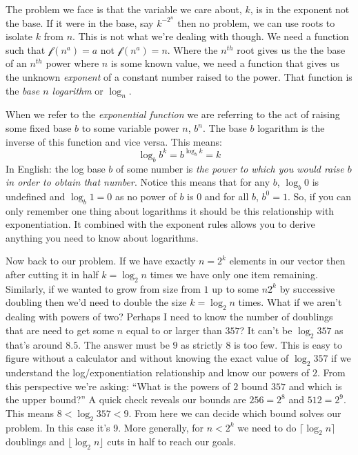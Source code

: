 \documentclass[nobib]{tufte-handout}
\begin{document}
The problem we face is that the variable we care about, $k$, is in the exponent not the base. If it were in the base, say $k^{-2^n}$ then no problem, we can use roots to isolate $k$ from $n$. This is not what we're dealing with though. We need a function such that $\mathcal{f}(n^a)=a$ not $\mathcal{f}(n^a) = n$. Where the $n^{th}$ root gives us the the base of an $n^{th}$ power where $n$ is some known value, we need a function that gives us the unknown \textit{exponent} of a constant number raised to the power. That function is the \textit{base $n$ logarithm} or $\log_n$.

When we refer to the \textit{exponential function} we are referring to the act of raising some fixed base $b$ to some variable power $n$, $b^n$. The base $b$ logarithm is the inverse of this function and vice versa. This means:
\begin{equation}
  \log_b{b^k} = b^{\log_b{k}} = k
\end{equation}
In English: the log base $b$ of some number is \textit{the power to which you would raise $b$ in order to obtain that number}. Notice this means that for any $b$, $\log_b{0}$ is undefined and $\log_b{1} = 0$ as no power of $b$ is 0 and for all $b$, $b^0=1$. So, if you can only remember one thing about logarithms it should be this relationship with exponentiation. It combined with the exponent rules allows you to derive anything you need to know about logarithms.

Now back to our problem.  If we have exactly $n=2^k$ elements in our vector then after cutting it in half $k=\log_2{n}$ times we have only one item remaining. Similarly, if we wanted to grow from size from $1$ up to some $n2^k$ by successive doubling then we'd need to double the size $k=\log_2{n}$ times. What if we aren't dealing with powers of two? Perhaps I need to know the number of doublings that are need to get some $n$ equal to or larger than $357$? It can't be $\log_2{357}$ as that's around $8.5$. The answer must be $9$ as strictly $8$ is too few. This is easy to figure without a calculator and without knowing the exact value of $\log_2{357}$ if we understand the log/exponentiation relationship and know our powers of $2$. From this perspective we're asking: ``What is the powers of $2$ bound $357$ and which is the upper bound?'' A quick check reveals our bounds are $256=2^8$ and $512=2^9$. This means $8 < \log_2{357} < 9$. From here we can decide which bound solves our problem. In this case it's 9. More generally, for $n < 2^k$ we need to do $\lceil \log_2{n} \rceil$ doublings and $\lfloor \log_2{n} \rfloor$ cuts in half to reach our goals.
\end{document}
